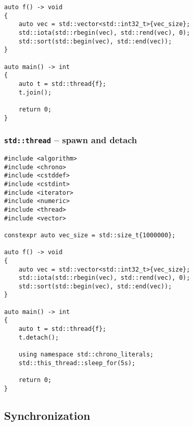 \begin{appendix}
\begin{lstlisting}
auto f() -> void
{
    auto vec = std::vector<std::int32_t>{vec_size};
    std::iota(std::rbegin(vec), std::rend(vec), 0);
    std::sort(std::begin(vec), std::end(vec));
}

auto main() -> int
{
    auto t = std::thread{f};
    t.join();
    
    return 0;
}
\end{lstlisting}

\subsubsection{\texttt{std::thread} -- spawn and detach}\label{app:conc_thread_detach}

\begin{lstlisting}
#include <algorithm>
#include <chrono>
#include <cstddef>
#include <cstdint>
#include <iterator>
#include <numeric>
#include <thread>
#include <vector>

constexpr auto vec_size = std::size_t{1000000};

auto f() -> void
{
    auto vec = std::vector<std::int32_t>{vec_size};
    std::iota(std::rbegin(vec), std::rend(vec), 0);
    std::sort(std::begin(vec), std::end(vec));
}

auto main() -> int
{
    auto t = std::thread{f};
    t.detach();
    
    using namespace std::chrono_literals;
    std::this_thread::sleep_for(5s);
    
    return 0;
}
\end{lstlisting}

\subsection{Synchronization}\label{app:scorep_sync}

\end{appendix}